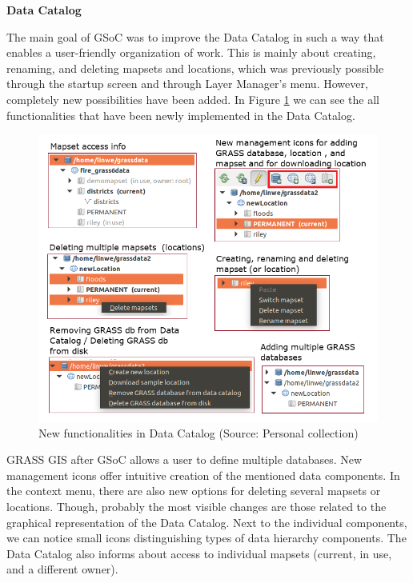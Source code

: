 \documentclass[a4paper,10pt,twoside]{article}
\begin{document}
\bigskip
\noindent \textbf {Data Catalog}

\noindent The main goal of GSoC was to improve the Data Catalog in
such a way that enables a user-friendly organization of work. This is
mainly about creating, renaming, and deleting mapsets and locations,
which was previously possible through the startup screen and through 
Layer Manager's menu. However, completely new possibilities have 
been added. In Figure \ref{fig:function} we can see the all
functionalities that have been newly implemented in the Data Catalog.

\vspace{0.3cm}
\begin{figure}[hbt!] 
\begin{center}
\includegraphics[width=13cm]{../pictures/funkce.png} 
\caption[New functionalities in Data Catalog]{New functionalities in Data Catalog (Source: Personal collection)}
\label{fig:function}
\end{center}
\end{figure}

\noindent GRASS GIS after GSoC allows a user
to define multiple databases. New management icons offer intuitive
creation of the mentioned data components. In the context menu, there
are also new options for deleting several mapsets or
locations. Though, probably the most visible changes are those related
to the graphical representation of the Data Catalog. Next to the
individual components, we can notice small icons distinguishing types
of data hierarchy components. The Data Catalog also informs about
access to individual mapsets (current, in use, and a different
owner). 
\end{document}
